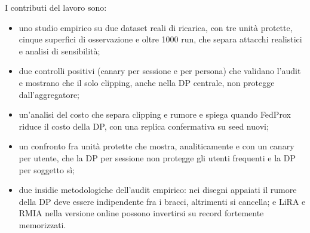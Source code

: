 I contributi del lavoro sono:
\begin{itemize}[leftmargin=*]
  \item uno studio empirico su due dataset reali di ricarica, con tre unità protette, cinque
        superfici di osservazione e oltre 1000 run, che separa attacchi realistici e analisi di
        sensibilità;
  \item due controlli positivi (canary per sessione e per persona) che validano l'audit e
        mostrano che il solo clipping, anche nella DP centrale, non protegge dall'aggregatore;
  \item un'analisi del costo che separa clipping e rumore e spiega quando FedProx riduce il
        costo della DP, con una replica confermativa su seed nuovi;
  \item un confronto fra unità protette che mostra, analiticamente e con un canary per utente,
        che la DP per sessione non protegge gli utenti frequenti e la DP per soggetto sì;
  \item due insidie metodologiche dell'audit empirico: nei disegni appaiati il rumore della DP
        deve essere indipendente fra i bracci, altrimenti si cancella; e LiRA e RMIA nella
        versione online possono invertirsi su record fortemente memorizzati.
\end{itemize}
